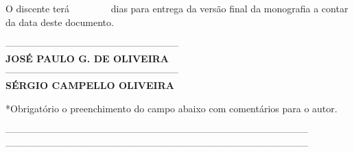 \documentclass[12pt]{article}
\begin{document}
	    O discente terá \ \ \ \ \ \ \ \ dias para entrega da versão final da monografia a contar da data deste documento.
	    \begin{center}
            ------------------------------------------------------ \\ {\bf JOSÉ PAULO G. DE OLIVEIRA} \\[1cm]
            ------------------------------------------------------ \\ {\bf SÉRGIO CAMPELLO OLIVEIRA} \\[1cm]
        \end{center}
        \small{*Obrigatório o preenchimento do campo abaixo com comentários para o autor.}\\[0.1cm]
        \begin{center}
            -----------------------------------------------------------------------------------------------\\[0.1cm]-----------------------------------------------------------------------------------------------
        \end{center}
\end{document}
